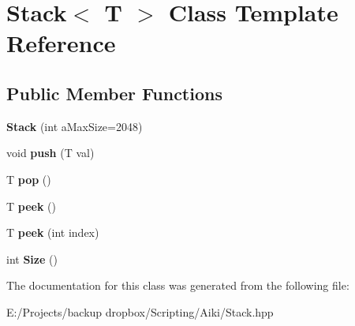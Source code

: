 \hypertarget{a00022}{\section{Stack$<$ T $>$ Class Template Reference}
\label{a00022}
}
\subsection*{Public Member Functions}
\begin{DoxyCompactItemize}
\item 
\hypertarget{a00022_abe82b456eaa470780ea183224c47501a}{{\bfseries Stack} (int a\+Max\+Size=2048)}\label{a00022_abe82b456eaa470780ea183224c47501a}

\item 
\hypertarget{a00022_ace28110b50a0a2f4f3c8fd5263413661}{void {\bfseries push} (T val)}\label{a00022_ace28110b50a0a2f4f3c8fd5263413661}

\item 
\hypertarget{a00022_aa2ea0e8c3293648589dd734d52487408}{T {\bfseries pop} ()}\label{a00022_aa2ea0e8c3293648589dd734d52487408}

\item 
\hypertarget{a00022_adcb4774ac8aa94cbc19b461da9bdee3a}{T {\bfseries peek} ()}\label{a00022_adcb4774ac8aa94cbc19b461da9bdee3a}

\item 
\hypertarget{a00022_a753f43c9236116e1e68f52022d24bb3d}{T {\bfseries peek} (int index)}\label{a00022_a753f43c9236116e1e68f52022d24bb3d}

\item 
\hypertarget{a00022_a71b9623c81ddeb690c6fd0c7fb1d7bba}{int {\bfseries Size} ()}\label{a00022_a71b9623c81ddeb690c6fd0c7fb1d7bba}

\end{DoxyCompactItemize}


The documentation for this class was generated from the following file\+:\begin{DoxyCompactItemize}
\item 
E\+:/\+Projects/backup dropbox/\+Scripting/\+Aiki/Stack.\+hpp\end{DoxyCompactItemize}
